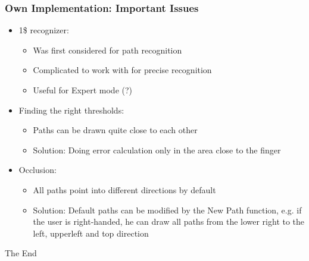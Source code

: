 \documentclass{beamer}
\begin{document}

\begin{frame}
\frametitle{Own Implementation: Important Issues}

\begin{itemize}
\item 1\$ recognizer:
	\begin{itemize}
	\item Was first considered for path recognition
	\item Complicated to work with for precise recognition
	\item Useful for Expert mode (?)\newline
	\end{itemize}
\pause
\item Finding the right thresholds:
	\begin{itemize}
	\item Paths can be drawn quite close to each other
	\item Solution: Doing error calculation only in the area close to the finger \newline
	\end{itemize}
\pause
\item Occlusion:
	\begin{itemize}
	\item All paths point into different directions by default
	\item Solution: Default paths can be modified by the \grqq New Path \grqq function, e.g. if the user is right-handed, he can draw all paths from the lower right to the left, upperleft and top direction
	\end{itemize}

\end{itemize}

\end{frame}




\begin{frame}
\Huge{\centerline{The End}}
\end{frame}

\end{document}
